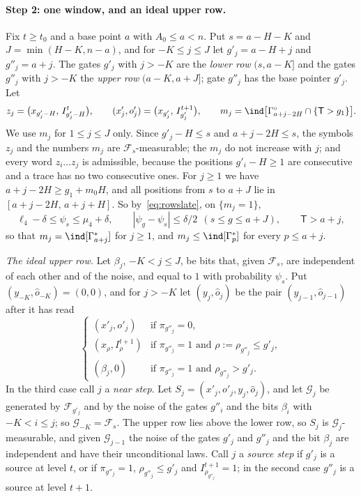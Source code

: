 \documentclass[11pt]{amsart}
\theoremstyle{definition}
\theoremstyle{remark}
\newcommand{\cF}{\mathcal{F}}
\begin{document}
\paragraph{Step 2: one window, and an ideal upper row.}
Fix $t\ge t_0$ and a base point $a$ with $A_0\le a<n$. Put $s=a-H-K$ and $J=\min(H-K,n-a)$, and
for $-K\le j\le J$ let $g'_j=a-H+j$ and $g''_j=a+j$. The gates $g'_j$ with $j>-K$ are the
\emph{lower row} $(s,a-K]$ and the gates $g''_j$ with $j>-K$ the \emph{upper row} $(a-K,a+J]$;
gate $g''_j$ has the base pointer $g'_j$. Let
\[
z_j=\bigl(x_{g'_j-H},\,I^t_{g'_j-H}\bigr),\qquad (x'_j,o'_j)=\bigl(x_{g'_j},\,I^{t+1}_{g'_j}\bigr),\qquad
m_j=\ind\bigl[\Gamma^\circ_{a+j-2H}\cap\{\mathsf T>g_1\}\bigr].
\]
We use $m_j$ for $1\le j\le J$ only. Since $g'_j-H\le s$ and $a+j-2H\le s$, the symbols $z_j$ and
the numbers $m_j$ are $\cF_s$-measurable; the $m_j$ do not increase with $j$; and every word
$z_i\dots z_j$ is admissible, because the positions $g'_i-H\ge1$ are consecutive and a trace has
no two consecutive ones. For $j\ge1$ we have $a+j-2H\ge g_1+m_0H$, and all positions from $s$ to
$a+J$ lie in $[a+j-2H,\,a+j+H]$. So by~\eqref{eq:rowslate}, on $\{m_j=1\}$,
\begin{equation}\label{eq:rowswin}
\ell_4-\delta\le\psi_s\le\mu_4+\delta,\qquad|\psi_g-\psi_s|\le\delta/2\ \ (s\le g\le a+J),\qquad
\mathsf T>a+j,
\end{equation}
so that $m_j=\ind[\Gamma^*_{a+j}]$ for $j\ge1$, and $m_j\le\ind[\Gamma^*_p]$ for every $p\le a+j$.

\emph{The ideal upper row.} Let $\beta_j$, $-K<j\le J$, be bits that, given $\cF_s$, are
independent of each other and of the noise, and equal to $1$ with probability $\psi_s$. Put
$(y_{-K},\hat o_{-K})=(0,0)$, and for $j>-K$ let $(y_j,\hat o_j)$ be the pair
$(y_{j-1},\hat o_{j-1})$ after it has read
\[
\begin{cases}
(x'_j,o'_j)&\text{if }\pi_{g''_j}=0,\\
(x_\rho,I^{t+1}_\rho)&\text{if }\pi_{g''_j}=1\text{ and }\rho:=\rho_{g''_j}\le g'_j,\\
(\beta_j,0)&\text{if }\pi_{g''_j}=1\text{ and }\rho_{g''_j}>g'_j .
\end{cases}
\]
In the third case call $j$ a \emph{near step}. Let $S_j=(x'_j,o'_j,y_j,\hat o_j)$, and let
$\mathcal G_j$ be generated by $\cF_{g'_j}$ and by the noise of the gates $g''_i$ and the bits
$\beta_i$ with $-K<i\le j$; so $\mathcal G_{-K}=\cF_s$. The upper row lies above the lower row, so $S_j$ is
$\mathcal G_j$-measurable, and given $\mathcal G_{j-1}$ the noise of the gates $g'_j$ and $g''_j$
and the bit $\beta_j$ are independent and have their unconditional laws. Call $j$ a \emph{source
step} if $g'_j$ is a source at level $t$, or if $\pi_{g''_j}=1$, $\rho_{g''_j}\le g'_j$ and
$I^{t+1}_{\rho_{g''_j}}=1$; in the second case $g''_j$ is a source at level $t+1$.
\end{document}
